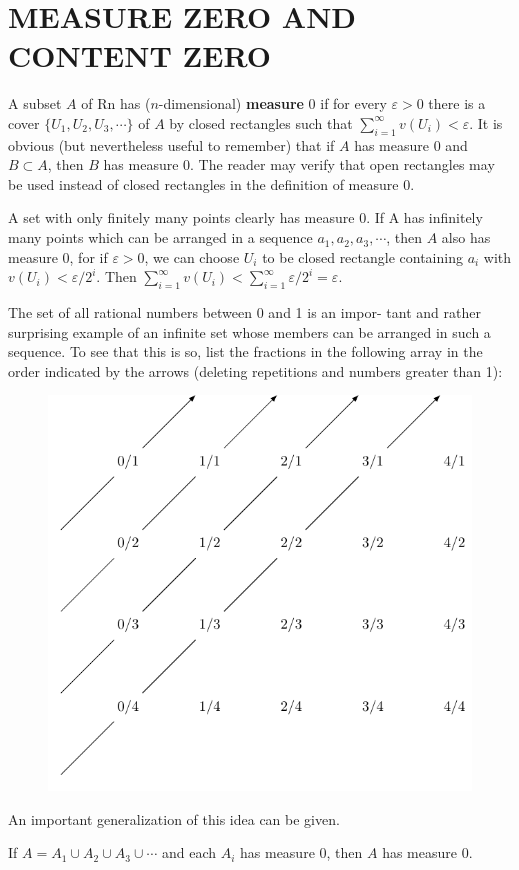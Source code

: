 \section{MEASURE ZERO AND CONTENT ZERO}
A subset $A$ of Rn has ($n$-dimensional) \textbf{measure} 0 if for every
$\varepsilon > 0$ there is a cover $\{U_1, U_2, U_3, \cdots \}$ of $A$ by 
closed rectangles such that $\sum_{i=1}^{\infty}{v(U_i)}< \varepsilon$.
It is obvious (but nevertheless useful to remember) that if $A$ has measure 0 and
$B \subset A$, then $B$ has measure 0.
The reader may verify that open rectangles may be used instead of closed rectangles in
the definition of measure 0.

A set with only finitely many points clearly has measure 0.
If A has infinitely many points which can be arranged in a
sequence $a_1, a_2, a_3,\cdots$, then $A$ also has measure 0, 
for if $\varepsilon>0$, we can choose $U_i$ to be closed rectangle
containing $a_i$ with $v(U_i)< \varepsilon/2^i$. Then 
$\sum_{i=1 }^{\infty}{v(U_i)} < \sum_{i=1 }^{\infty}{\varepsilon/2^i} = \varepsilon$.

The set of all rational numbers between 0 and 1 is an impor-
tant and rather surprising example of an infinite set whose
members can be arranged in such a sequence.
To see that this is so, list the fractions in the following array in the order
indicated by the arrows (deleting repetitions and numbers
greater than 1):

\begin{figure}[H]
    \centering
    \includegraphics[width=.65\linewidth]{./pics/Fig3-(1).pdf}
\end{figure}

An important generalization of this idea can be given.

\begin{theorem}
    If $A = A_1\cup A_2 \cup A_3\cup \cdots$ and each $A_i$ has measure 0, then $A$ has measure 0.
\end{theorem}

